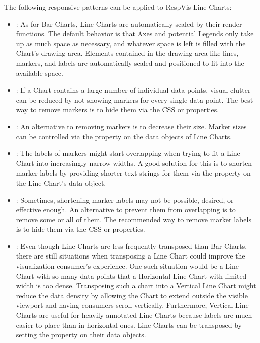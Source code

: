The following responsive patterns can be applied to RespVis Line Charts:
\begin{itemize}
\item {}: As for Bar Charts, Line Charts are
  automatically scaled by their render functions. The default behavior
  is that Axes and potential Legends only take up as much space as
  necessary, and whatever space is left is filled with the Chart's
  drawing area. Elements contained in the drawing area like lines,
  markers, and labels are automatically scaled and positioned to fit
  into the available space.

\item {}: If a Chart contains a large number of
  individual data points, visual clutter can be reduced by not showing
  markers for every single data point. The best way to remove markers
  is to hide them via the CSS  or 
  properties.

\item {}: An alternative to removing markers is
  to decrease their size. Marker sizes can be controlled via the
   property on the data objects of Line Charts.

\item {}: The labels of markers might
  start overlapping when trying to fit a Line Chart into increasingly
  narrow widths. A good solution for this is to shorten marker labels
  by providing shorter text strings for them via the 
  property on the Line Chart's data object.

\item {}: Sometimes, shortening marker
  labels may not be possible, desired, or effective enough. An
  alternative to prevent them from overlapping is to remove some or
  all of them. The recommended way to remove marker labels is to hide
  them via the CSS  or  properties.

\item {}: Even though Line Charts are less
  frequently transposed than Bar Charts, there are still situations
  when transposing a Line Chart could improve the visualization
  consumer's experience. One such situation would be a Line Chart with
  so many data points that a Horizontal Line Chart with limited width
  is too dense. Transposing such a chart into a Vertical Line Chart
  might reduce the data density by allowing the Chart to extend
  outside the visible viewport and having consumers scroll vertically.
  Furthermore, Vertical Line Charts are useful for heavily annotated
  Line Charts because labels are much easier to place than in
  horizontal ones. Line Charts can be transposed by setting the
   property on their data objects.


\end{itemize}

